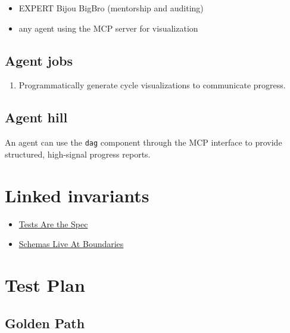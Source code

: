 \begin{itemize}
\tightlist
\item
  EXPERT Bijou BigBro (mentorship and auditing)
\item
  any agent using the MCP server for visualization
\end{itemize}

\subsection{Agent jobs}\label{record-251-agent-jobs}

\begin{enumerate}
\def\labelenumi{\arabic{enumi}.}
\tightlist
\item
  Programmatically generate cycle visualizations to communicate progress.
\end{enumerate}

\subsection{Agent hill}\label{record-251-agent-hill}

An agent can use the \texttt{d\allowbreak{}a\allowbreak{}g} component through the MCP interface to provide structured, high-signal progress reports.

\section{Linked invariants}\label{record-251-linked-invariants}

\begin{itemize}
\tightlist
\item
  \href{https://github.com/flyingrobots/bijou/blob/cbd70612140e7a450d764b3c7be1c6af878b99bc/invariants/tests-are-the-spec.md}{Tests Are the Spec}
\item
  \href{https://github.com/flyingrobots/bijou/blob/cbd70612140e7a450d764b3c7be1c6af878b99bc/invariants/schemas-live-at-boundaries.md}{Schemas Live At Boundaries}
\end{itemize}

\section{Test Plan}\label{record-251-test-plan}

\subsection{Golden Path}\label{record-251-golden-path}


